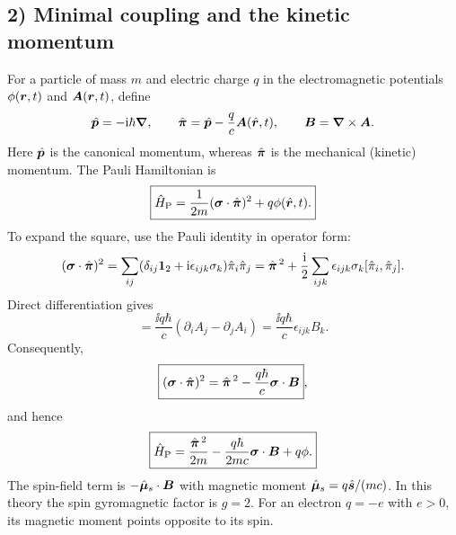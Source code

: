 \subsection*{2) Minimal coupling and the kinetic momentum}
For a particle of mass $m$ and electric charge $q$ in the electromagnetic potentials $\phi(\bm{r},t)$ and $\bm{A}(\bm{r},t)$, define
\begin{equation}
 \hat{\bm{p}}=-\mathrm{i}\hbar\bm{\nabla},\qquad
 \hat{\bm{\pi}}=\hat{\bm{p}}-\frac qc\bm{A}(\hat{\bm{r}},t),
 \qquad \bm{B}=\bm{\nabla}\times\bm{A}.
\end{equation}
Here $\hat{\bm{p}}$ is the canonical momentum, whereas $\hat{\bm{\pi}}$ is the mechanical (kinetic) momentum. The Pauli Hamiltonian is
\begin{equation}\label{eq:pauli-compact}
\boxed{\hat{H}_{\mathrm P}=\frac1{2m}(\bm{\sigma}\cdot\hat{\bm{\pi}})^2+q\phi(\hat{\bm{r}},t).}
\end{equation}
To expand the square, use the Pauli identity in operator form:
\begin{equation}
(\bm{\sigma}\cdot\hat{\bm{\pi}})^2
=\sum_{ij}(\delta_{ij}\mathbf1_2+\mathrm{i}\epsilon_{ijk}\sigma_k)\hat{\pi}_i\hat{\pi}_j
=\hat{\bm{\pi}}^{\,2}+\frac{\mathrm{i}}2\sum_{ijk}\epsilon_{ijk}\sigma_k[\hat{\pi}_i,\hat{\pi}_j].
\end{equation}
Direct differentiation gives
\begin{equation}
[\op\pi_i,\op\pi_j]
=\frac{\ii q\hbar}{c}(\partial_i A_j-\partial_j A_i)
=\frac{\ii q\hbar}{c}\epsilon_{ijk}B_k.
\end{equation}
Consequently,
\begin{equation}
\boxed{(\bm{\sigma}\cdot\hat{\bm{\pi}})^2
=\hat{\bm{\pi}}^{\,2}-\frac{q\hbar}{c}\bm{\sigma}\cdot\bm{B}},
\end{equation}
and hence
\begin{equation}\label{eq:pauli-expanded}
\boxed{\hat{H}_{\mathrm P}=\frac{\hat{\bm{\pi}}^{\,2}}{2m}
-\frac{q\hbar}{2mc}\bm{\sigma}\cdot\bm{B}+q\phi.}
\end{equation}
The spin-field term is $-\hat{\bm{\mu}}_{s}\cdot\bm{B}$ with magnetic moment $\hat{\bm{\mu}}_s=q\hat{\bm{s}}/(mc)$. In this theory the spin gyromagnetic factor is $g=2$. For an electron $q=-e$ with $e>0$, its magnetic moment points opposite to its spin.

